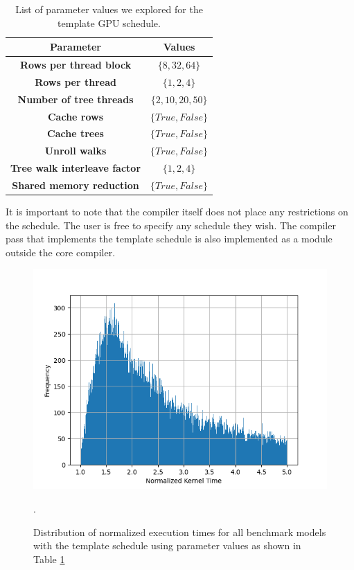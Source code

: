 \begin{table}[htb]
  \footnotesize
  \centering
  \begin{tabularx}{\linewidth}{c | c }
    \toprule
    \textbf{Parameter} & \textbf{Values} \\
    \midrule
    \textbf{Rows per thread block} & $\{8, 32, 64\}$ \\
    \textbf{Rows per thread} & $\{1, 2, 4\}$ \\
    \textbf{Number of tree threads} & $\{2, 10, 20, 50\}$ \\
    \textbf{Cache rows} & $\{True, False\}$ \\
    \textbf{Cache trees} & $\{True, False\}$ \\
    \textbf{Unroll walks} & $\{True, False\}$ \\
    \textbf{Tree walk interleave factor} & $\{1, 2, 4\}$ \\
    \textbf{Shared memory reduction} & $\{True, False\}$ \\
    \bottomrule
  \end{tabularx}
  \vskip 5pt
  \caption{\label{tab:schedparams} List of parameter values we explored for the template GPU schedule.}
\end{table}

It is important to note that the \Treebeard{} compiler itself does not place any 
restrictions on the schedule. The user is free to specify any schedule they wish.
The compiler pass that implements the template schedule is also implemented as a 
module outside the core \Treebeard{} compiler. 

\begin{figure}[htb]
  \centering
  \includegraphics[width=0.7\linewidth]{figures/normalized_kernel_histogram_lt5.png}
  \caption{Distribution of normalized execution times for all benchmark models
  with the template schedule using parameter values as shown in Table \ref{tab:schedparams}}. 
  \label{Fig:ExecTimeDistribution}
\end{figure}

